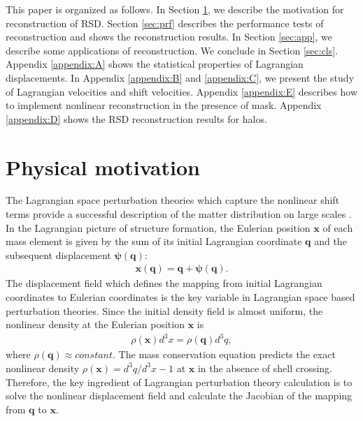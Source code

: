 \documentclass[aps,prd,twocolumn,superscriptaddress,groupedaddress,nofootinbib,amsfont]{revtex4}  %
\newcommand{\bea}{\begin{eqnarray}}
\newcommand{\eea}{\end{eqnarray}}
\newcommand{\bmp}{\bm{\psi}}
\newcommand{\bmx}{\bm{x}}
\newcommand{\bmq}{\bm{q}}
\begin{document}
This paper is organized as follows. In Section \ref{sec:mot}, we describe the 
motivation for reconstruction of RSD.
Section \ref{sec:prf} describes the performance tests of reconstruction and 
shows the reconstruction results.
In Section \ref{sec:app}, we describe some applications of reconstruction.
We conclude in Section \ref{sec:cls}.
Appendix \ref{appendix:A} shows the statistical properties of Lagrangian 
displacements. 
In Appendix \ref{appendix:B} and \ref{appendix:C}, we present the 
study of Lagrangian velocities and shift velocities.
Appendix \ref{appendix:E} describes how to implement nonlinear reconstruction
in the presence of mask.
Appendix \ref{appendix:D} shows the RSD reconstruction results for halos.



\section{Physical motivation}
\label{sec:mot}

The Lagrangian space perturbation theories which capture the nonlinear shift 
terms provide a successful description of the matter distribution on large 
scales \cite{2008M,2008M2,LPT3,2014PSZ,2013CRW,2015VSB,2015SV,2015VWA,2016VCW,
2016matt,2016BSZ,2016BSZ2}.
In the Lagrangian picture of structure formation, the Eulerian position $\bmx$
of each mass element is given by the sum of its initial Lagrangian coordinate 
$\bmq$ and the subsequent displacement $\bmp(\bmq)$:
\bea
\bm{x}(\bm{q})=\bmq+\bm{\psi}(\bmq).
\eea
The displacement field which defines the mapping from initial Lagrangian 
coordinates to Eulerian coordinates is the key variable in Lagrangian space 
based perturbation theories.
Since the initial density field is almost uniform, the nonlinear density at the
Eulerian position $\bmx$ is 
\bea
\rho(\bmx)d^3x=\rho(\bmq)d^3q,
\eea
where $\rho(\bmq)\approx constant$. The mass conservation equation predicts the 
exact nonlinear density $\rho(\bmx)=d^3q/d^3x-1$ at $\bmx$ in the absence of 
shell crossing. Therefore, the key ingredient of Lagrangian perturbation theory
calculation is to solve the nonlinear displacement field and calculate the 
Jacobian of the mapping from $\bmq$ to $\bmx$.
\end{document}
